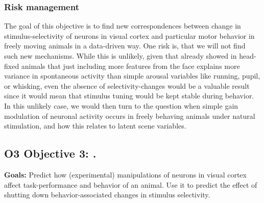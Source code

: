 \documentclass[B2,COG]{ercgrant}
\begin{document}
\subsubsection{Risk management} 
The goal of this objective is to find new correspondences between change in stimulus-selectivity of neurons in visual cortex and particular motor behavior in freely moving animals in a data-driven way.
One risk is, that we will not find such new mechanisms.
While this is unlikely, given that \textcite{Stringer2019-lt} already showed in head-fixed animals that just including more features from the face explains more variance in spontaneous activity than simple arousal variables like running, pupil, or whisking, even the absence of selectivity-changes would be a valuable result since it would mean that stimulus tuning would be kept stable during behavior. 
In this unlikely case, we would then turn to the question when simple gain modulation of neuronal activity occurs in freely behaving animals under natural stimulation, and how this relates to latent scene variables. 




\subsection{\colorbox{obj3}{\color{white} O3} Objective 3: \othreetitle .}

\textbf{Goals:} Predict how (experimental) manipulations of neurons in visual cortex affect task-performance and behavior of an animal. Use it to predict the effect of shutting down behavior-associated changes in stimulus selectivity. 
\end{document}
